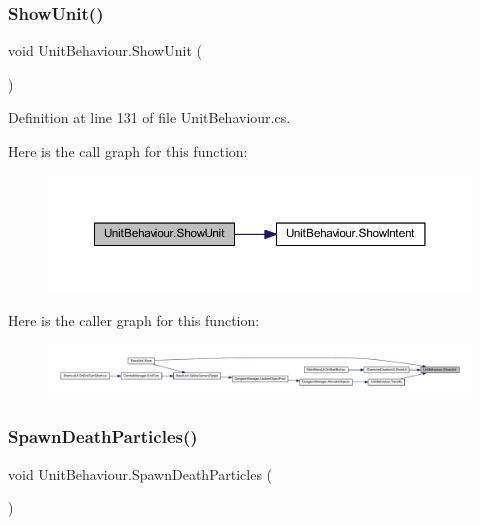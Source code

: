 \subsubsection{\texorpdfstring{ShowUnit()}{ShowUnit()}}
{\footnotesize\ttfamily void Unit\+Behaviour.\+Show\+Unit (\begin{DoxyParamCaption}{ }\end{DoxyParamCaption})}



Definition at line 131 of file Unit\+Behaviour.\+cs.

Here is the call graph for this function\+:
\nopagebreak
\begin{figure}[H]
\begin{center}
\leavevmode
\includegraphics[width=350pt]{class_unit_behaviour_a41b8d7f5a98e21449eafe21a31707b1d_cgraph}
\end{center}
\end{figure}
Here is the caller graph for this function\+:
\nopagebreak
\begin{figure}[H]
\begin{center}
\leavevmode
\includegraphics[width=350pt]{class_unit_behaviour_a41b8d7f5a98e21449eafe21a31707b1d_icgraph}
\end{center}
\end{figure}
\mbox{\label{class_unit_behaviour_a17b46e508ee650f487d4bf79608da4eb}} 
\subsubsection{\texorpdfstring{SpawnDeathParticles()}{SpawnDeathParticles()}}
{\footnotesize\ttfamily void Unit\+Behaviour.\+Spawn\+Death\+Particles (\begin{DoxyParamCaption}{ }\end{DoxyParamCaption})}



